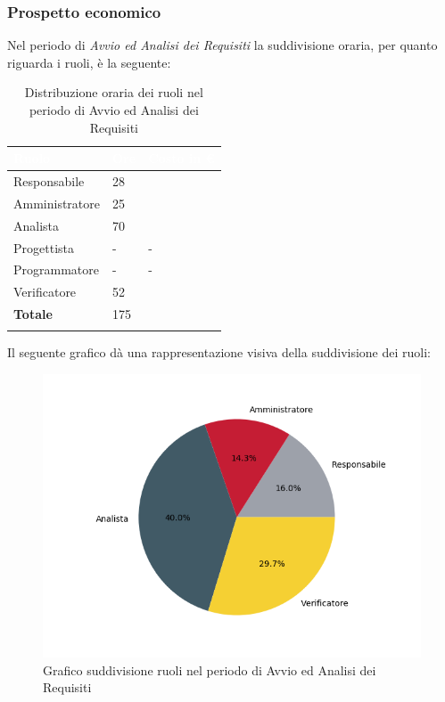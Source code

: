 \subsubsection{Prospetto economico}
Nel periodo di \textit{Avvio ed Analisi dei Requisiti} la suddivisione oraria, per quanto riguarda i ruoli, è la seguente: 

\begin{longtable}{| C{.30\textwidth}| C{.15\textwidth}| C{.20\textwidth}|}
\hline
{}\textbf{\textcolor{white}{Ruolo}} & \textbf{\textcolor{white}{Ore}} & \textbf{\textcolor{white}{Costo in \euro}} \\
\hline
Responsabile & 28 &  \\
\hline
{}Amministratore & 25 &  \\
\hline
Analista & 70 &  \\
\hline
{}Progettista & - & - \\
\hline
Programmatore & - & - \\
\hline
{}Verificatore & 52 & \\
\hline
\textbf{Totale} & 175 &  \\
\hline

\caption{Distribuzione oraria dei ruoli nel periodo di Avvio ed Analisi dei Requisiti}
\label{tab: distribuzione oraria aar}
\end{longtable}

Il seguente grafico dà una rappresentazione visiva della suddivisione dei ruoli:
\begin{figure}[H]
	\centering
  		\includegraphics[width=1\linewidth]{./images/torta_aar.png}
  		\caption{Grafico suddivisione ruoli nel periodo di Avvio ed Analisi dei Requisiti}
  		\label{fig:grafico suddivione ruoli periodo di Avvio ed analisi dei requisiti}
\end{figure}

